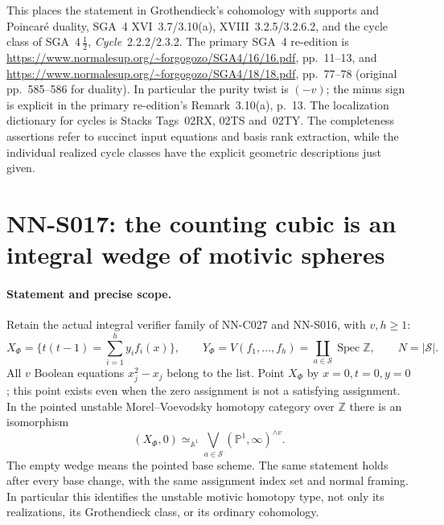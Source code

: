 This places the statement in Grothendieck's cohomology with supports and
Poincar\'e duality, SGA~4 XVI~3.7/3.10(a), XVIII~3.2.5/3.2.6.2, and
the cycle class of SGA~4\,$\frac12$, \emph{Cycle}~2.2.2/2.3.2.
The primary SGA~4 re-edition is
\url{https://www.normalesup.org/~forgogozo/SGA4/16/16.pdf}, pp.~11--13,
and \url{https://www.normalesup.org/~forgogozo/SGA4/18/18.pdf},
pp.~77--78 (original pp.~585--586 for duality).
In particular the purity twist is $(-v)$; the minus sign is explicit
in the primary re-edition's Remark~3.10(a), p.~13.
The localization dictionary for cycles is Stacks Tags~02RX, 02TS and~02TY.
The completeness assertions refer to succinct input equations and basis
rank extraction, while the individual realized cycle classes have the
explicit geometric descriptions just given.


\section{NN-S017: the counting cubic is an integral wedge of motivic spheres}

\paragraph{Statement and precise scope.}
Retain the actual integral verifier family of NN-C027 and NN-S016,
with $v,h\ge1$:
\[
 X_\Phi=\{t(t-1)=\textstyle\sum_{i=1}^h y_i f_i(x)\},\qquad
 Y_\Phi=V(f_1,\ldots,f_h)=\coprod_{a\in\mathcal S}\operatorname{Spec}\mathbb Z,
 \qquad N=|\mathcal S|.
\]
All $v$ Boolean equations $x_j^2-x_j$ belong to the list. Point
$X_\Phi$ by $x=0,t=0,y=0$; this point exists even when the zero
assignment is not a satisfying assignment. In the pointed unstable
Morel--Voevodsky homotopy category over $\mathbb Z$ there is an isomorphism
\begin{equation}\label{eq:S017-motivic-wedge}
 (X_\Phi,0)\simeq_{\mathbb A^1}
       \bigvee_{a\in\mathcal S}(\mathbb P^1,\infty)^{\wedge v}.
\end{equation}
The empty wedge means the pointed base scheme. The same statement holds
after every base change, with the same assignment index set and normal
framing. In particular this identifies the unstable motivic homotopy
type, not only its realizations, its Grothendieck class, or its ordinary
cohomology.

